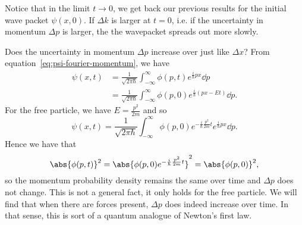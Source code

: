 \documentclass[../quantum_mechanics.tex]{subfiles}
\begin{document}
            Notice that in the limit $t\to 0$, we get back our previous results for the initial wave packet $\psi(x,0)$.
            If $\Delta k$ is larger at $t=0$, i.e. if the uncertainty in momentum $\Delta p$ is larger, the the wavepacket spreads out more slowly.

            Does the uncertainty in momentum $\Delta p$ increase over just like $\Delta x$?
            From equation~\ref{eq:psi-fourier-momentum}, we have
            \begin{align}
                \psi(x,t)&=\frac{1}{\sqrt{2\pi\hbar}}\int_{-\infty}^\infty\phi(p,t)e^{\frac{i}{\hbar}px}\dd{p}\\
                &=\frac{1}{\sqrt{2\pi\hbar}}\int_{-\infty}^\infty\phi(p,0)e^{\frac{i}{\hbar}(px-Et)}\dd{p}.
            \end{align}
            For the free particle, we have $E=\frac{p^2}{2m}$ and so
            \begin{equation}
                \psi(x,t)=\frac{1}{\sqrt{2\pi\hbar}}\int_{-\infty}^\infty\phi(p,0)e^{-\frac{i}{\hbar}\frac{p^2}{2m}t}e^{\frac{i}{\hbar}px}\dd{p}.
            \end{equation}
            Hence we have that
            \begin{equation}
                \abs{\phi(p,t)}^2=\abs{\phi(p,0)e^{-\frac{i}{\hbar}\frac{p^2}{2m}t}}^2=\abs{\phi(p,0)}^2,
            \end{equation}
            so the momentum probability density remains the same over time and $\Delta p$ does not change.
            This is not a general fact, it only holds for the free particle.
            We will find that when there are forces present, $\Delta p$ does indeed increase over time.
            In that sense, this is sort of a quantum analogue of Newton's first law.

    
\end{document}
